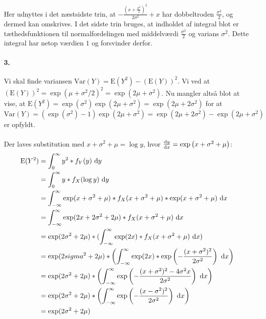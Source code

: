 Her udnyttes i det næstsidste trin, at $-\frac{(x +
\frac{\sigma^2}{2})^2}{2\sigma^2} + x$ har dobbeltroden $\frac{\sigma^2}{2}$, og
dermed kan omskrives. I det sidste trin bruges, at indholdet af integral blot er
tæthedsfunktionen til normalfordelingen med middelværdi $\frac{\sigma^2}{2}$
og varians $\sigma^2$. Dette integral har netop værdien $1$ og forsvinder
derfor.

\paragraph{3.} Vi skal finde variansen $\mathrm{Var}(Y) = \mathrm{E}(Y^2)
- (\mathrm{E}(Y))^2$. Vi ved at $(\mathrm{E}(Y))^2 = \exp(\mu+\sigma^2
/ 2)^2 = \exp(2\mu + \sigma^2)$. Nu mangler altså blot at vise, at
$\mathrm{E}(Y^2)=\exp(\sigma^2)\exp(2\mu+\sigma^2) = \exp(2\mu+ 2\sigma^2)$
for at $\mathrm{Var}(Y) = (\exp(\sigma^2) - 1)\exp(2\mu+\sigma^2) =
\exp(2\mu+2\sigma^2) - \exp(2\mu+\sigma^2)$ er opfyldt.\\
\\
Der laves substitution med $x + \sigma^2 + \mu = \log y$, hvor
$\frac{\mathrm{d} y}{\mathrm{d} x} = \exp\left(x+\sigma^2 + \mu\right)$:
\begin{align*}
\mathrm{E}(Y^2)
&= \int_0^\infty y^2 * f_Y(y)\ \mathrm{d} y \\
&= \int_0^\infty y * f_X(\log y)\ \mathrm{d} y \\
&= \int_{-\infty}^\infty
      \exp(x+\sigma^2 + \mu) *
       f_X(x+\sigma^2 + \mu) *
      \exp(x+\sigma^2 + \mu)
   \ \mathrm{d} x \\
&= \int_{-\infty}^\infty
      \exp(2x+2\sigma^2 + 2\mu) *
       f_X(x+\sigma^2 + \mu)
   \ \mathrm{d} x \\
&= \exp(2\sigma^2 + 2\mu) *
   (\int_{-\infty}^\infty
      \exp(2x) *
       f_X(x+\sigma^2 + \mu)
   \ \mathrm{d} x)\\
&= \exp(2sigma^2 + 2\mu) *
   \left(\int_{-\infty}^\infty
      \exp(2x) *
      \exp\left(
        -\frac{(x+\sigma^2)^2}{2\sigma^2}
      \right)
   \ \mathrm{d} x\right)\\
&= \exp(2\sigma^2 + 2\mu) *
   \left(\int_{-\infty}^\infty
      \exp\left(
        -\frac{(x+\sigma^2)^2 - 4\sigma^2 x}{2\sigma^2}
      \right)
   \ \mathrm{d} x\right) \\
&= \exp(2\sigma^2 + 2\mu) *
   \left(\int_{-\infty}^\infty
      \exp\left(
        -\frac{(x-\sigma^2)^2}{2\sigma^2}
      \right)
   \ \mathrm{d} x\right) \\
&= \exp(2\sigma^2 + 2\mu)
\end{align*}

